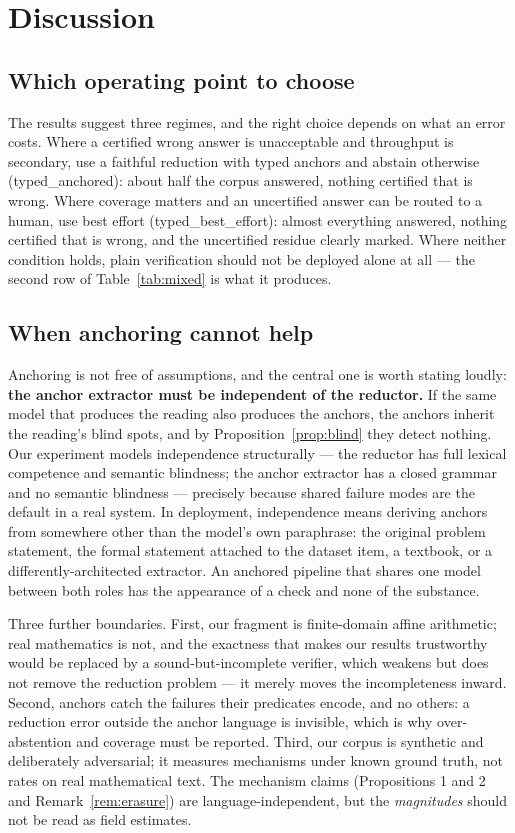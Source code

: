 \documentclass[11pt]{article}
\newcommand{\pTypAnch}{\textsf{typed\_anchored}}
\newcommand{\pTypBest}{\textsf{typed\_best\_effort}}
\theoremstyle{definition}
\begin{document}
\section{Discussion}
\label{sec:discussion}

\subsection{Which operating point to choose}
\label{sec:operating}

The results suggest three regimes, and the right choice depends on what an error
costs. Where a certified wrong answer is unacceptable and throughput is
secondary, use a faithful reduction with typed anchors and abstain otherwise
(\pTypAnch): about half the corpus answered, nothing certified that is wrong.
Where coverage matters and an uncertified answer can be routed to a human, use
best effort (\pTypBest): almost everything answered, nothing certified that is
wrong, and the uncertified residue clearly marked. Where neither condition holds,
plain verification should not be deployed alone at all --- the second row of
Table~\ref{tab:mixed} is what it produces.

\subsection{When anchoring cannot help}
\label{sec:limits}

Anchoring is not free of assumptions, and the central one is worth stating
loudly: \textbf{the anchor extractor must be independent of the reductor.} If the
same model that produces the reading also produces the anchors, the anchors
inherit the reading's blind spots, and by Proposition~\ref{prop:blind} they detect
nothing. Our experiment models independence structurally --- the reductor has
full lexical competence and semantic blindness; the anchor extractor has a closed
grammar and no semantic blindness --- precisely because shared failure modes are
the default in a real system. In deployment, independence means deriving anchors
from somewhere other than the model's own paraphrase: the original problem
statement, the formal statement attached to the dataset item, a textbook, or a
differently-architected extractor. An anchored pipeline that shares one model
between both roles has the appearance of a check and none of the substance.

Three further boundaries. First, our fragment is finite-domain affine arithmetic;
real mathematics is not, and the exactness that makes our results trustworthy
would be replaced by a sound-but-incomplete verifier, which weakens but does not
remove the reduction problem --- it merely moves the incompleteness inward.
Second, anchors catch the failures their predicates encode, and no others: a
reduction error outside the anchor language is invisible, which is why
over-abstention and coverage must be reported. Third, our corpus is synthetic and
deliberately adversarial; it measures mechanisms under known ground truth, not
rates on real mathematical text. The mechanism claims (Propositions 1 and 2 and
Remark~\ref{rem:erasure}) are language-independent, but the \emph{magnitudes}
should not be read as field estimates.
\end{document}
